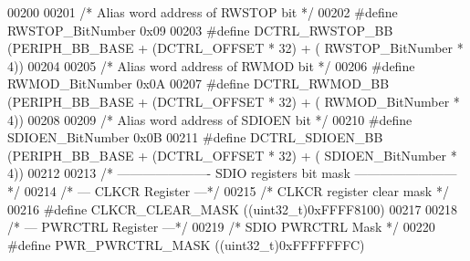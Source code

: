 \begin{DoxyCode}
00200 
00201 \textcolor{comment}{/* Alias word address of RWSTOP bit */}
00202 \textcolor{preprocessor}{#}\textcolor{preprocessor}{define} \textcolor{preprocessor}{RWSTOP\_BitNumber}          0x09
00203 \textcolor{preprocessor}{#}\textcolor{preprocessor}{define} \textcolor{preprocessor}{DCTRL\_RWSTOP\_BB}           \textcolor{preprocessor}{(}PERIPH_BB_BASE \textcolor{preprocessor}{+} \textcolor{preprocessor}{(}DCTRL_OFFSET \textcolor{preprocessor}{*} 32\textcolor{preprocessor}{)} \textcolor{preprocessor}{+} \textcolor{preprocessor}{(}
      RWSTOP_BitNumber \textcolor{preprocessor}{*} 4\textcolor{preprocessor}{)}\textcolor{preprocessor}{)}
00204 
00205 \textcolor{comment}{/* Alias word address of RWMOD bit */}
00206 \textcolor{preprocessor}{#}\textcolor{preprocessor}{define} \textcolor{preprocessor}{RWMOD\_BitNumber}           0x0A
00207 \textcolor{preprocessor}{#}\textcolor{preprocessor}{define} \textcolor{preprocessor}{DCTRL\_RWMOD\_BB}            \textcolor{preprocessor}{(}PERIPH_BB_BASE \textcolor{preprocessor}{+} \textcolor{preprocessor}{(}DCTRL_OFFSET \textcolor{preprocessor}{*} 32\textcolor{preprocessor}{)} \textcolor{preprocessor}{+} \textcolor{preprocessor}{(}
      RWMOD_BitNumber \textcolor{preprocessor}{*} 4\textcolor{preprocessor}{)}\textcolor{preprocessor}{)}
00208 
00209 \textcolor{comment}{/* Alias word address of SDIOEN bit */}
00210 \textcolor{preprocessor}{#}\textcolor{preprocessor}{define} \textcolor{preprocessor}{SDIOEN\_BitNumber}          0x0B
00211 \textcolor{preprocessor}{#}\textcolor{preprocessor}{define} \textcolor{preprocessor}{DCTRL\_SDIOEN\_BB}           \textcolor{preprocessor}{(}PERIPH_BB_BASE \textcolor{preprocessor}{+} \textcolor{preprocessor}{(}DCTRL_OFFSET \textcolor{preprocessor}{*} 32\textcolor{preprocessor}{)} \textcolor{preprocessor}{+} \textcolor{preprocessor}{(}
      SDIOEN_BitNumber \textcolor{preprocessor}{*} 4\textcolor{preprocessor}{)}\textcolor{preprocessor}{)}
00212 
00213 \textcolor{comment}{/* ---------------------- SDIO registers bit mask ------------------------ */}
00214 \textcolor{comment}{/* --- CLKCR Register ---*/}
00215 \textcolor{comment}{/* CLKCR register clear mask */}
00216 \textcolor{preprocessor}{#}\textcolor{preprocessor}{define} \textcolor{preprocessor}{CLKCR\_CLEAR\_MASK}         \textcolor{preprocessor}{(}\textcolor{preprocessor}{(}\textcolor{preprocessor}{uint32\_t}\textcolor{preprocessor}{)}0xFFFF8100\textcolor{preprocessor}{)}
00217 
00218 \textcolor{comment}{/* --- PWRCTRL Register ---*/}
00219 \textcolor{comment}{/* SDIO PWRCTRL Mask */}
00220 \textcolor{preprocessor}{#}\textcolor{preprocessor}{define} \textcolor{preprocessor}{PWR\_PWRCTRL\_MASK}         \textcolor{preprocessor}{(}\textcolor{preprocessor}{(}\textcolor{preprocessor}{uint32\_t}\textcolor{preprocessor}{)}0xFFFFFFFC\textcolor{preprocessor}{)}

\end{DoxyCode}
